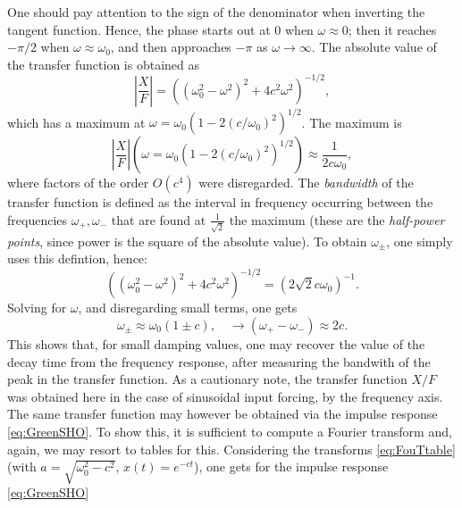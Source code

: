 One should pay attention to the sign of the denominator when inverting the tangent function. Hence, the phase starts out at $0$ when $\omega \approx 0$; then it reaches $-\pi/2$ when $\omega \approx \omega_0$, and then approaches $-\pi$ as $\omega \rightarrow \infty$. The absolute value of the transfer function is obtained as
\begin{equation}\label{eq:XFlinearOsc}
    \left|\frac{X}{F}\right|  = \left((\omega_0^2-\omega^2)^2+4c^2\omega^2\right)^{-1/2},
\end{equation}
which has a maximum at $\omega = \omega_0 \left(1-2(c/\omega_0)^2 \right)^{1/2}$. The maximum is 
\begin{equation}
    \left|\frac{X}{F}\right|(\omega = \omega_0 \left(1-2(c/\omega_0)^2 \right)^{1/2}) \approx \frac{1}{2c\omega_0},
\end{equation}
where factors of the order $O(c^4)$ were disregarded. The \emph{bandwidth} of the transfer function is defined as the interval in frequency occurring between the frequencies $\omega_+,\omega_-$ that are found at $\frac{1}{\sqrt{2}}$ the maximum (these are the \emph{half-power points}, since power is the square of the absolute value). To obtain $\omega_\pm$, one simply uses this defintion, hence:
\begin{equation}
    \left((\omega_0^2-\omega^2)^2+4c^2\omega^2\right)^{-1/2} = \left(2\sqrt{2} c\omega_0\right)^{-1}.
\end{equation}
Solving for $\omega$, and disregarding small terms, one gets
\begin{equation}
    \omega_\pm \approx \omega_0\left(1 \pm {c} \right), \quad \rightarrow (\omega_+ - \omega_-) \approx 2c.
\end{equation}
This shows that, for small damping values, one may recover the value of the decay time from the frequency response, after measuring the bandwith of the peak in the transfer function. As a cautionary note, the transfer function $X/F$ was obtained here in the case of sinusoidal input forcing, by  the frequency axis. The same transfer function may however be obtained via the impulse response \eqref{eq:GreenSHO}. To show this, it is sufficient to compute a Fourier transform and, again, we may resort to tables for this. Considering the transforms \eqref{eq:FouTtable} (with $a = \sqrt{\omega_0^2 - c^2}$, $x(t) = e^{-ct}$), one gets for the impulse response \eqref{eq:GreenSHO}
